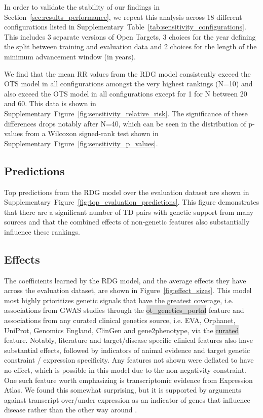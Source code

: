 \documentclass{article}
\begin{document}
In order to validate the stability of our findings in Section~\ref{sec:results_performance}, we repeat this analysis across 18 different configurations listed in Supplementary~Table~\ref{tab:sensitivity_configurations}. This includes 3 separate versions of Open Targets, 3 choices for the year defining the split between training and evaluation data and 2 choices for the length of the minimum advancement window (in years).

We find that the mean RR values from the RDG model consistently exceed the OTS model in all configurations amongst the very highest rankings (N=10) and also exceed the OTS model in all configurations except for 1 for N between 20 and 60. This data is shown in Supplementary~Figure~\ref{fig:sensitivity_relative_risk}. The significance of these differences drops notably after N=40, which can be seen in the distribution of p-values from a Wilcoxon signed-rank test shown in Supplementary~Figure~\ref{fig:sensitivity_p_values}.

\subsection{Predictions}

Top predictions from the RDG model over the evaluation dataset are shown in Supplementary~Figure~\ref{fig:top_evaluation_predictions}. This figure demonstrates that there are a significant number of TD pairs with genetic support from many sources and that the combined effects of non-genetic features also substantially influence these rankings. 

\subsection{Effects}

The coefficients learned by the RDG model, and the average effects they have across the evaluation dataset, are shown in Figure~\ref{fig:effect_sizes}. This model most highly prioritizes genetic signals that have the greatest coverage, i.e. associations from GWAS studies through the \colorbox{Gainsboro}{ot\_genetics\_portal} feature and associations from any curated clinical genetics source, i.e. EVA, Orphanet, UniProt, Genomics England, ClinGen and gene2phenotype, via the \colorbox{Gainsboro}{curated} \vspace*{0mm} feature.  Notably, literature and target/disease specific clinical features also have substantial effects, followed by indicators of animal evidence and target genetic constraint / expression specificity. Any features not shown were deflated to have no effect, which is possible in this model due to the non-negativity constraint. One such feature worth emphasizing is transcriptomic evidence from Expression Atlas. We found this somewhat surprising, but it is supported by arguments against transcript over/under expression as an indicator of genes that influence disease rather than the other way around \cite{PMID:34561431}.
\end{document}
